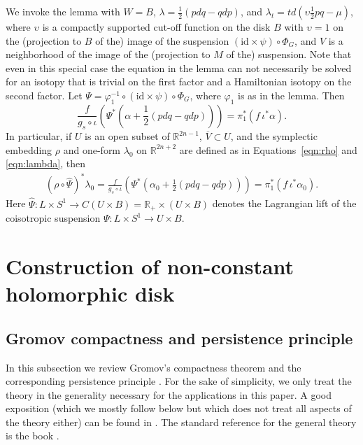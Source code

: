 \documentclass{amsart}
\theoremstyle{remark}
\def\id{{\textrm{id}}}
\def\R{{\mathbb R}}
\begin{document}
We invoke the lemma with $W = B$, $\lambda = \frac{1}{2} (p dq - q dp)$, and $\lambda_t = t d(\upsilon \frac{1}{2} p q - \mu)$, where $\upsilon$ is a compactly supported cut-off function on the disk $B$ with $\upsilon = 1$ on the (projection to $B$ of the) image of the suspension $(\id \times \psi) \circ \Phi_G$, and $V$ is a neighborhood of the image of the (projection to $M$ of the) suspension.
Note that even in this special case the equation in the lemma can not necessarily be solved for an isotopy that is trivial on the first factor and a Hamiltonian isotopy on the second factor.
Let $\Psi = \varphi_1^{- 1} \circ (\id \times \psi) \circ \Phi_G$, where $\varphi_1$ is as in the lemma.
Then
\[ \frac{f}{g_s \circ \iota} \left( \Psi^* \left( \alpha + \frac{1}{2} (p dq - q dp) \right) \right) = \pi_1^* (f \, \iota^* \alpha). \]
In particular, if $U$ is an open subset of $\R^{2 n - 1}$, $\overline{V} \subset U$, and the symplectic embedding $\rho$ and one-form $\lambda_0$ on $\R^{2 n + 2}$ are defined as in Equations~\ref{eqn:rho} and \ref{eqn:lambda}, then
\begin{align} \label{eqn:cohomology-class}
(\rho \circ \widehat{\Psi})^* \lambda_0 = \frac{f}{g_s \circ \iota} \left( \Psi^* \left( \alpha_0 + \frac{1}{2} (p dq - q dp) \right) \right) = \pi_1^* (f \, \iota^* \alpha_0).
\end{align}
Here $\widehat{\Psi} \colon L \times S^1 \to C (U \times B) = \R_+ \times (U \times B)$ denotes the Lagrangian lift of the coisotropic suspension $\Psi \colon L \times S^1 \to U \times B$.

\section{Construction of non-constant holomorphic disk} \label{sec:holo-disk}

\subsection{Gromov compactness and persistence principle} \label{subsec:gromov-compact}
In this subsection we review Gromov's compactness theorem and the corresponding persistence principle \cite[Section~1.5]{gromov:pcs85}.
For the sake of simplicity, we only treat the theory in the generality necessary for the applications in this paper.
A good exposition (which we mostly follow below but which does not treat all aspects of the theory either) can be found in \cite[Chapter~4]{polterovich:ggs01}.
The standard reference for the general theory is the book \cite{mcduff:hcs04}.
\end{document}
